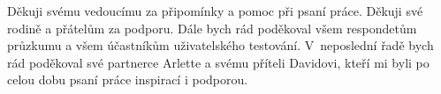Děkuji svému vedoucímu za připomínky a pomoc při psaní práce. Děkuji své rodině a přátelům za podporu. Dále bych rád poděkoval všem respondetům průzkumu a všem účastníkům uživatelského testování. V~neposlední řadě bych rád poděkoval své partnerce Arlette a svému příteli Davidovi, kteří mi byli po celou dobu psaní práce inspirací i podporou.